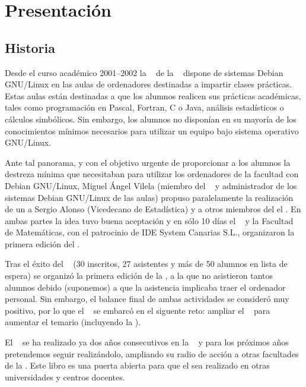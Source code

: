 
\chapter*{Presentación}

\section*{Historia}

Desde el curso  académico 2001--2002 la \FMAT~ de la  \ULL~ dispone de
sistemas Debian  GNU/Linux en  las aulas  de ordenadores  destinadas a
impartir  clases prácticas.  Estas aulas  están destinadas  a que  los
alumnos  realicen sus  prácticas académicas,  tales como  programación
en  Pascal,  Fortran,  C  o Java,  análisis  estadísticos  o  cálculos
simbólicos. Sin embargo, los alumnos no disponían en su mayoría de los
conocimientos mínimos necesarios para  utilizar un equipo bajo sistema
operativo GNU/Linux.

Ante  tal  panorama, y  con  el  objetivo  urgente de  proporcionar  a
los  alumnos la  destreza  mínima que  necesitaban  para utilizar  los
ordenadores de  la facultad  con Debian  GNU/Linux, {\sc  Miguel Ángel
Vilela} (miembro  del \GULiC~ y  administrador de los  sistemas Debian
GNU/Linux de  las aulas)  propuso paralelamente  la realización  de un
{\bf\CILA} a {\sc Sergio Alonso} (Vicedecano de Estadística) y a otros
miembros del el \GULiC. En ambas  partes la idea tuvo buena aceptación
y en  sólo 10  días el \GULiC~  y la Facultad  de Matemáticas,  con el
patrocinio de IDE System Canarias S.L., organizaron la primera edición
del \CILA.

Tras el  éxito del  \CILA~ (30  inscritos, 27 asistentes  y más  de 50
alumnos  en lista  de espera)  se organizó  la primera  edición de  la
{\bf\PILA}, a la que no asistieron tantos alumnos debido (suponemos) a
que la asistencia implicaba traer  el ordenador personal. Sin embargo,
el balance final  de ambas actividades se consideró  muy positivo, por
lo que  el \GULiC~ se embarcó  en el siguente reto:  ampliar el \CILA~
para  aumentar  el temario  (incluyendo  la  \PILA). 

El \CILA~ se ha realizado ya dos años consecutivos en la \FMAT~ y para
los próximos años pretendemos  seguir realizándolo, ampliando su radio
de acción  a otras  facultades de  la \ULL. Este  libro es  una puerta
abierta  para que  el \CILA  sea  realizado en  otras universidades  y
centros docentes.

